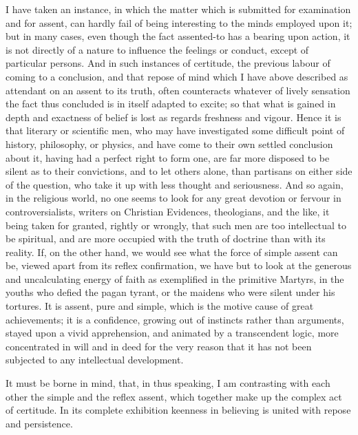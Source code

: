 I have taken an instance, in which the matter which is submitted
for examination and for assent, can hardly fail of being interesting
to the minds employed upon it; but in many cases, even though the fact
assented-to has a bearing upon action, it is not directly of a nature
to influence the feelings or conduct, except of particular persons.
And in such instances of certitude, the previous labour of coming to a
conclusion, and that repose of mind which I have above described as
attendant on an assent to its truth, often counteracts whatever of
lively sensation the fact thus concluded is in itself adapted to
excite; so that what is gained in depth and exactness of belief is
lost as regards freshness and vigour. Hence it is that literary or
scientific men, who may have investigated some difficult point of
history, philosophy, or physics, and have come to their own settled
conclusion about it, having had a perfect right to form one, are far
more disposed to be silent as to their convictions, and to let others
alone, than partisans on either side of the question, who take it
up with less thought and seriousness. And so again, in the
religious world, no one seems to look for any great devotion or
fervour in controversialists, writers on Christian Evidences,
theologians, and the like, it being taken for granted, rightly or
wrongly, that such men are too intellectual to be spiritual, and are
more occupied with the truth of doctrine than with its reality. If, on
the other hand, we would see what the force of simple assent can be,
viewed apart from its reflex confirmation, we have but to look at the
generous and uncalculating energy of faith as exemplified in the
primitive Martyrs, in the youths who defied the pagan tyrant, or the
maidens who were silent under his tortures. It is assent, pure and
simple, which is the motive cause of great achievements; it is a
confidence, growing out of instincts rather than arguments, stayed
upon a vivid apprehension, and animated by a transcendent logic, more
concentrated in will and in deed for the very reason that it has not
been subjected to any intellectual development.

It must be borne in mind, that, in thus speaking, I am contrasting
with each other the simple and the reflex assent, which together make
up the complex act of certitude. In its complete exhibition keenness
in believing is united with repose and persistence.

